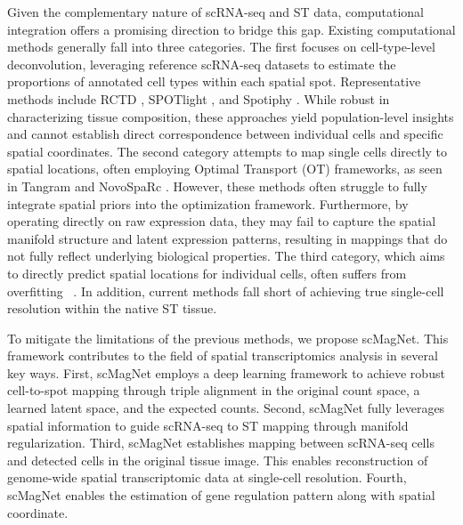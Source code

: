 \documentclass[10pt,a4paper]{article}
\begin{document}
Given the complementary nature of scRNA-seq and ST data, computational integration offers a promising direction to bridge this gap. Existing computational methods generally fall into three categories. The first focuses on cell-type-level deconvolution, leveraging reference scRNA-seq datasets to estimate the proportions of annotated cell types within each spatial spot. Representative methods include RCTD \cite{Cable2022}, SPOTlight \cite{Elosua-Bayes2021}, and Spotiphy \cite{Yang2025}. While robust in characterizing tissue composition, these approaches yield population-level insights and cannot establish direct correspondence between individual cells and specific spatial coordinates. The second category attempts to map single cells directly to spatial locations, often employing Optimal Transport (OT) frameworks, as seen in Tangram \cite{Biancalani2021} and NovoSpaRc \cite{Moriel2021}. However, these methods often struggle to fully integrate spatial priors into the optimization framework. Furthermore, by operating directly on raw expression data, they may fail to capture the spatial manifold structure and latent expression patterns, resulting in mappings that do not fully reflect underlying biological properties. The third category, which aims to directly predict spatial locations for individual cells, often suffers from overfitting ~\cite{Wei2022,Qian2023,Li2025}. In addition, current methods fall short of achieving true single-cell resolution within the native ST tissue.

To mitigate the limitations of the previous methods, we propose scMagNet. This framework contributes to the field of spatial transcriptomics analysis in several key ways. First, scMagNet employs a deep learning framework to achieve robust cell-to-spot mapping through triple alignment in the original count space, a learned latent space, and the expected counts. Second, scMagNet fully leverages spatial information to guide scRNA-seq to ST mapping through manifold regularization. Third, scMagNet establishes mapping between scRNA-seq cells and detected cells in the original tissue image. This enables reconstruction of genome-wide spatial transcriptomic data at single-cell resolution. Fourth, scMagNet enables the estimation of gene regulation pattern along with spatial coordinate.
\end{document}
